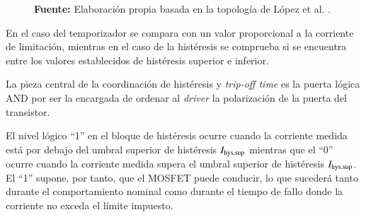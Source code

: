 \documentclass[12pt]{report} %
\begin{document}
\begin{figure}[H]
{
    }
    
    \vspace{2mm}
    {\raggedleft \textbf{Fuente:} Elaboración propia basada en la topología de López et al. \cite{lopez_antuna_diseno_2024}. \par}
\end{figure}
En el caso del temporizador se compara con un valor proporcional a la corriente de limitación, mientras en el caso de la histéresis se comprueba si se encuentra entre los valores establecidos de histéresis superior e inferior. 

La pieza central de la coordinación de histéresis y \textit{trip-off time} es la puerta lógica AND por ser la encargada de ordenar al \textit{driver} la polarización de la puerta del transistor. 

El nivel lógico ``1'' en el bloque de histéresis ocurre cuando la corriente medida está por debajo del umbral superior de histéresis $I_{\text{hys,sup}}$ mientras que el ``0'' ocurre cuando la corriente medida supera el umbral superior de histéresis $I_{\text{hys,sup}}$. El ``1'' supone, por tanto, que el MOSFET puede conducir, lo que sucederá tanto durante el comportamiento nominal como durante el tiempo de fallo donde la corriente no exceda el límite impuesto. 
\end{document}
